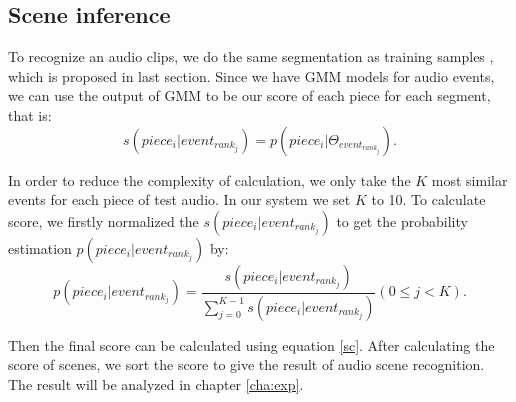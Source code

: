\subsection{Scene inference}
To recognize an audio clips, we do the same segmentation as training samples , which is proposed in last section. Since we have GMM models for audio events, we can use the output of GMM to be our score of each piece for each segment, that is:
\begin{equation}
s(piece_i|event_{rank_j}) = p(piece_i|\Theta_{event_{rank_j}}).
\end{equation}

In order to reduce the complexity of calculation, we only take the $K$ most similar events for each piece of test audio. In our system we set $K$ to 10. To calculate score, we firstly normalized the $s(piece_i|event_{rank_j})$ to get the probability estimation $p(piece_i|event_{rank_j})$ by:
\begin{equation}
p(piece_i|event_{rank_j}) = \frac{s(piece_i|event_{rank_j})}{\sum_{j=0}^{K-1}s(piece_i|event_{rank_j})} (0\leq j < K).
\end{equation}

Then the final score can be calculated using equation \ref{sc}. After calculating the score of scenes, we sort the score to give the result of audio scene recognition. The result will be analyzed in chapter \ref{cha:exp}.

